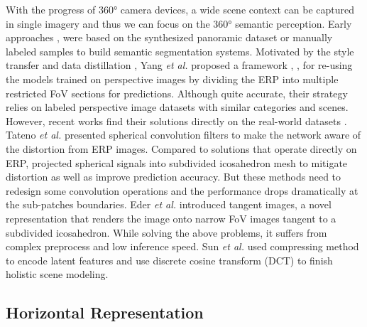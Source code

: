 \documentclass[runningheads]{llncs}
\begin{document}
	With the progress of 360° camera devices, a wide scene context can be captured in single imagery and thus we can focus on the 360° semantic perception.
	Early approaches \cite{budvytis2019large}, \cite{xu2019semantic} were based on the synthesized panoramic dataset or manually labeled samples to build semantic segmentation systems.
	Motivated by the style transfer \cite{zhu2017unpaired} and data distillation \cite{radosavovic2018data}, Yang \emph{et al.} proposed a framework \cite{yang2019pass}, \cite{yang2020ds}, \cite{yang2021capturing} for re-using the models trained on perspective images by dividing the ERP into multiple restricted FoV sections for predictions.
	Although quite accurate, their strategy relies on labeled perspective image datasets with similar categories and scenes.
	However, recent works find their solutions directly on the real-world datasets \cite{armeni2017joint}.
	Tateno \emph{et al.} \cite{tateno2018distortion} presented spherical convolution filters to make the network aware of the distortion from ERP images.
	Compared to solutions that operate directly on ERP, \cite{zhang2019orientation} projected spherical signals into subdivided icosahedron mesh to mitigate distortion as well as improve prediction accuracy.
	But these methods need to redesign some convolution operations and the performance drops dramatically at the sub-patches boundaries.
	Eder \emph{et al.} \cite{eder2020tangent} introduced tangent images, a novel representation that renders the image onto narrow FoV images tangent to a subdivided icosahedron.
	While solving the above problems, it suffers from complex preprocess and low inference speed.
	Sun \emph{et al.} \cite{sun2021hohonet} used compressing method to encode latent features and use discrete cosine transform (DCT) to finish holistic scene modeling.
	
	\subsection{Horizontal Representation}
	
\end{document}
